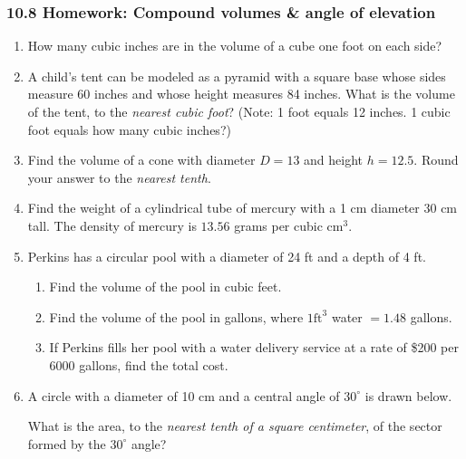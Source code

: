 \documentclass[12pt, twoside]{article}
\begin{document}
\subsubsection*{10.8 Homework: Compound volumes \& angle of elevation}
 \begin{enumerate}

  \item How many cubic inches are in the volume of a cube one foot on each side?  \vspace{3.0cm}

  \item A child’s tent can be modeled as a pyramid with a square base whose sides measure 60 inches and whose height measures 84 inches. What is the volume of the tent, to the \emph{nearest cubic foot}? (Note: 1 foot equals 12 inches. 1 cubic foot equals how many cubic inches?) \vspace{4.0cm}

  \item Find the volume of a cone with diameter $D=13$ and height $h=12.5$. Round your answer to the \emph{nearest tenth}. \vspace{4.5cm}

  \item Find the weight of a cylindrical tube of mercury with a 1 cm diameter 30 cm tall.  The density of mercury is $13.56$ grams per cubic $\mathrm{cm}^3$. \vspace{3.0cm}

\newpage
  \item Perkins has a circular pool with a diameter of 24 ft and a depth of 4 ft.
    \begin{enumerate}
      \item Find the volume of the pool in cubic feet. \vspace{2.5cm}
      \item Find the volume of the pool in gallons, where $1 \mathrm{ ft}^3$ water $= 1.48$ gallons. \vspace{2.5cm}
      \item If Perkins fills her pool with a water delivery service at a rate of \$200 per 6000 gallons, find the total cost.
    \end{enumerate} \vspace{2.5cm}

  \item A circle with a diameter of 10 cm and a central angle of $30^\circ$ is drawn below.
       \begin{center}
     \end{center}
  What is the area, to the \emph{nearest tenth of a square centimeter}, of the sector formed by the $30^\circ$ angle?


\end{enumerate}
\end{document}
